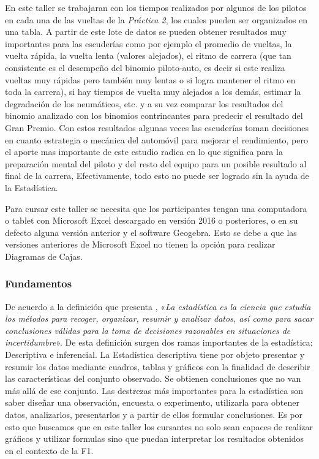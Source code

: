 En este taller se trabajaran con los tiempos realizados por algunos de los pilotos en cada una de las vueltas de la \textit{Práctica 2}, los cuales pueden ser organizados en una tabla. A partir de este lote de datos se pueden obtener resultados muy importantes para las escuderías como por ejemplo el promedio de vueltas, la vuelta rápida, la vuelta lenta (valores alejados), el ritmo de carrera (que tan consistente es el desempeño del binomio piloto-auto, es decir si este realiza vueltas muy rápidas pero también muy lentas o si logra mantener el ritmo en toda la carrera), si hay tiempos de vuelta muy alejados a los demás, estimar la degradación de los neumáticos, etc. y a su vez comparar los resultados del binomio analizado con los binomios contrincantes para predecir el resultado del Gran Premio. Con estos resultados algunas veces las escuderías toman decisiones en cuanto estrategia o mecánica del automóvil para mejorar el rendimiento, pero el aporte mas importante de este estudio radica en lo que significa para la preparación mental del piloto y del resto del equipo para un posible resultado al final de la carrera, Efectivamente, todo esto no puede ser logrado sin la ayuda de la Estadística.

Para cursar este taller se necesita que los participantes tengan una computadora o tablet con Microsoft Excel descargado en versión 2016 o posteriores, o en su defecto alguna versión anterior y el software Geogebra. Esto se debe a que las versiones anteriores de Microsoft Excel no tienen la opción para realizar Diagramas de Cajas.

\subsubsection{Fundamentos}

De acuerdo a la definición que presenta \textcite{ahumada15}, «\textit{La estadística es la ciencia que estudia los métodos para recoger, organizar, resumir y analizar datos, así como para sacar conclusiones válidas para la toma de decisiones razonables en situaciones de incertidumbre}». De esta definición surgen dos ramas importantes de la estadística: Descriptiva e inferencial. La Estadística descriptiva tiene por objeto presentar y resumir los datos mediante cuadros, tablas y gráficos con la finalidad de describir las características del conjunto observado. Se obtienen conclusiones que no van más allá de ese conjunto. Las destrezas más importantes para la estadística son saber diseñar una observación, encuesta o experimento, utilizarla para obtener datos, analizarlos, presentarlos y a partir de ellos formular conclusiones. Es por esto que buscamos que en este taller los cursantes no solo sean capaces de realizar gráficos y utilizar formulas sino que puedan interpretar los resultados obtenidos en el contexto de la F1.

